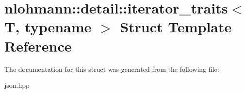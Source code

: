\hypertarget{structnlohmann_1_1detail_1_1iterator__traits}{}\section{nlohmann\+:\+:detail\+:\+:iterator\+\_\+traits$<$ T, typename $>$ Struct Template Reference}
\label{structnlohmann_1_1detail_1_1iterator__traits}


The documentation for this struct was generated from the following file\+:\begin{DoxyCompactItemize}
\item 
json.\+hpp\end{DoxyCompactItemize}

